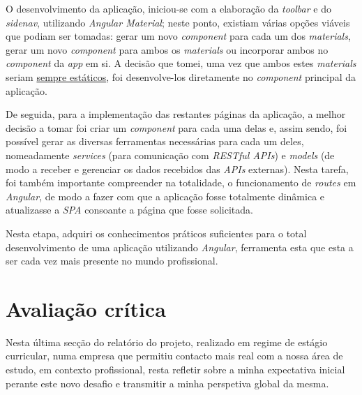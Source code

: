 \documentclass{article}
\begin{document}
\hspace*{0.5cm} O desenvolvimento da aplicação, iniciou-se com a elaboração da \emph{toolbar} e do \emph{sidenav}, utilizando \emph{Angular Material}; neste ponto, existiam várias opções viáveis que podiam ser tomadas: gerar um novo \emph{component} para cada um dos \emph{materials}, gerar um novo \emph{component} para ambos os \emph{materials} ou incorporar ambos no \emph{component} da \emph{app} em si. A decisão que tomei, uma vez que ambos estes \emph{materials} seriam \underline{sempre estáticos}, foi desenvolve-los diretamente no \emph{component} principal da aplicação. \newline

\hspace*{0.5cm} De seguida, para a implementação das restantes páginas da aplicação, a melhor decisão a tomar foi criar um \emph{component} para cada uma delas e, assim sendo, foi possível gerar as diversas ferramentas necessárias para cada um deles, nomeadamente \emph{services} (para comunicação com \emph{RESTful APIs}) e \emph{models} (de modo a receber e gerenciar os dados recebidos das \emph{APIs} externas). Nesta tarefa, foi também importante compreender na totalidade, o funcionamento de \emph{routes} em \emph{Angular}, de modo a fazer com que a aplicação fosse totalmente dinâmica e atualizasse a \emph{SPA} consoante a página que fosse solicitada.

\hspace*{0.5cm} Nesta etapa, adquiri os conhecimentos práticos suficientes para o total desenvolvimento de uma aplicação utilizando \emph{Angular}, ferramenta esta que esta a ser cada vez mais presente no mundo profissional.

\cleardoublepage
\section{Avaliação crítica}
\label{sec:ava-crt}
\hspace*{0.5cm} Nesta última secção do relatório do projeto, realizado em regime de estágio curricular, numa empresa que permitiu contacto mais real com a nossa área de estudo, em contexto profissional, resta refletir sobre a minha expectativa inicial perante este novo desafio e transmitir a minha perspetiva global da mesma. \newline
\end{document}
